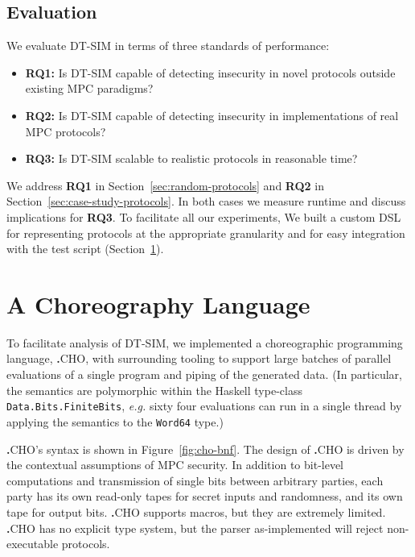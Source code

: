 \documentclass[acmlarge, manuscript, screen, review, anonymous, table]{acmart}
\newcommand{\eg}{\textit{e.g.}\xspace}
\newcommand{\langname}{\textsc{\textbf{.}CHO}\xspace}
\newcommand{\toolname}{\textsc{DT-SIM}\xspace}
\begin{document}
\subsection{Evaluation}\label{sec:evaluation}

We evaluate \toolname in terms of three standards of performance:
\begin{itemize}
\item \textbf{RQ1:} Is \toolname capable of detecting insecurity in novel protocols outside existing MPC paradigms?
\item \textbf{RQ2:} Is \toolname capable of detecting insecurity in implementations of real MPC protocols?
\item \textbf{RQ3:} Is \toolname scalable to realistic protocols in reasonable time?
\end{itemize}
We address \textbf{RQ1} in Section~\ref{sec:random-protocols}
and \textbf{RQ2} in Section~\ref{sec:case-study-protocols}.
In both cases we measure runtime and discuss implications for \textbf{RQ3}.
To facilitate all our experiments,
We built a custom DSL for representing protocols at the appropriate granularity and for easy integration with the test script
(Section~\ref{sec:cho-lang}).


\section{A Choreography Language}
\label{sec:cho-lang}

To facilitate analysis of \toolname, we implemented a choreographic programming language, \langname,
with surrounding tooling to support large batches of parallel evaluations of a single program and piping of the generated data.
(In particular, the semantics are polymorphic within the Haskell type-class \texttt{Data.Bits.FiniteBits},
\eg sixty four evaluations can run in a single thread by applying the semantics to the \texttt{Word64} type.)

\langname's syntax is shown in Figure~\ref{fig:cho-bnf}.
The design of \langname is driven by the contextual assumptions of MPC security.
In addition to bit-level computations and transmission of single bits between arbitrary parties,
each party has its own read-only tapes for secret inputs and randomness,
and its own tape for output bits.
\langname supports macros, but they are extremely limited.
\langname has no explicit type system, but the parser as-implemented will reject non-executable protocols.
\end{document}
